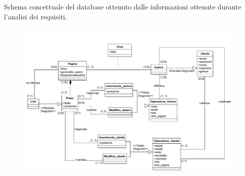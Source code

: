 Schema concettuale del database ottenuto dalle informazioni ottenute durante l’analisi dei requisiti.
\begin{figure}[h]
    \centering
    \includegraphics[width=1\textwidth]{Capitoli/Progettazione Concettuale/UML.pdf}
\end{figure}